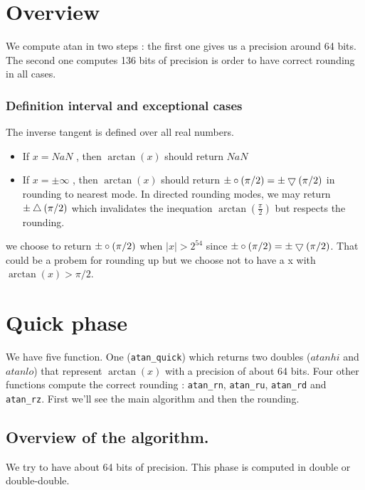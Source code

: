 \newcommand{\xred}{X_{\mathrm{red}}}
\newcommand{\xredhi}{X_{\mathrm{red hi}}}
\newcommand{\xredlo}{X_{\mathrm{red lo}}}

\section{Overview}

We compute atan in two steps : the first one gives us a precision around 64
bits. The second one computes 136 bits of precision is order to have
correct rounding in all cases.

\subsubsection{Definition interval and exceptional cases}

The inverse tangent is defined over all real numbers.

\begin{itemize}
\item If $x = NaN$ , then $\arctan(x)$ should return $NaN$
\item If $x = \pm\infty$ , then $\arctan(x)$ should return
$\pm\circ(\pi/2) = \pm\bigtriangledown(\pi/2)$ in rounding to nearest mode. In
directed rounding modes, we may return $\pm\bigtriangleup(\pi/2)$ which
invalidates the inequation $\arctan(\frac{\pi}{2})$ but respects the
rounding.
\end{itemize}
we choose to return $\pm\circ(\pi/2)$ when $|x|>2^{54}$ since
$\pm\circ(\pi/2) =\pm\bigtriangledown(\pi/2) $. That could be a probem for
rounding up but we choose not to have a x with $\arctan(x) > \pi/2$.
\section{Quick phase}

We have five function. One (\texttt{atan\_quick}) which returns two doubles
($atanhi$ and $atanlo$) that represent $\arctan(x)$ with a precision of
about 64 bits. Four other functions compute the correct rounding :
\texttt{atan\_rn}, \texttt{atan\_ru}, \texttt{atan\_rd} and
\texttt{atan\_rz}. First we'll see the main algorithm and then the rounding.

\subsection{Overview of the algorithm.}

We try to have about 64 bits of precision. This phase is computed in double
or double-double.

